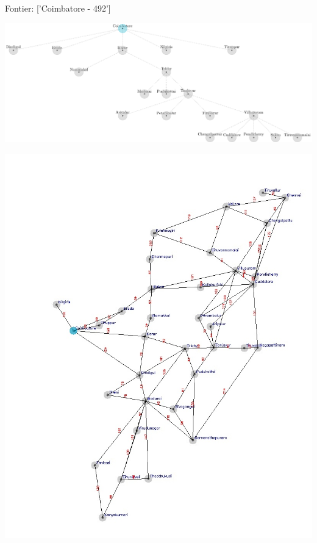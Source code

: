 \documentclass[xcolor=table]{beamer}
\begin{document}
\begin{frame}
  { \tiny Fontier: ['Coimbatore - 492'] }
  \begin{center}
  \includegraphics[height=0.35\textheight]{../GreedyNode/2-1.png}
  \end{center}
  \begin{center}
    \includegraphics[height=0.55\textheight]{../Greedyoutput/tamilGreedy0.jpg}
  \end{center}
\end{frame}
\end{document}
